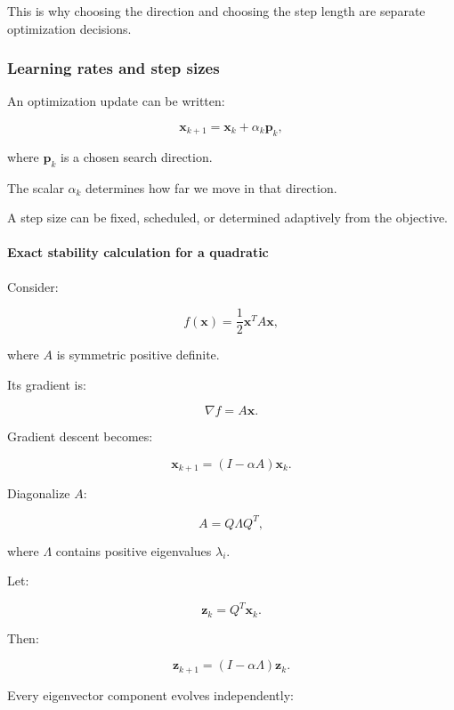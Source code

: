 This is why choosing the direction and choosing the step length are separate optimization decisions.

\subsubsection{Learning rates and step sizes}\label{02-foundations-ii-ch026-learning-rates-and-step-sizes}

\hypertarget{02-foundations-ii-ch026-learning-rates-and-step-sizes}{}

An optimization update can be written:

\[
\mathbf x_{k+1}=\mathbf x_k+\alpha_k\mathbf p_k,
\]

where \(\mathbf p_k\) is a chosen search direction.

The scalar \(\alpha_k\) determines how far we move in that direction.

A step size can be fixed, scheduled, or determined adaptively from the objective.

\paragraph{Exact stability calculation for a quadratic}\label{02-foundations-ii-ch026-exact-stability-calculation-for-a-quadratic}

\hypertarget{02-foundations-ii-ch026-exact-stability-calculation-for-a-quadratic}{}

Consider:

\[
f(\mathbf x)=\frac12\mathbf x^TA\mathbf x,
\]

where \(A\) is symmetric positive definite.

Its gradient is:

\[
\nabla f=A\mathbf x.
\]

Gradient descent becomes:

\[
\mathbf x_{k+1} = (I-\alpha A)\mathbf x_k.
\]

Diagonalize \(A\):

\[
A=Q\Lambda Q^T,
\]

where \(\Lambda\) contains positive eigenvalues \(\lambda_i\).

Let:

\[
\mathbf z_k=Q^T\mathbf x_k.
\]

Then:

\[
\mathbf z_{k+1} = (I-\alpha\Lambda)\mathbf z_k.
\]

Every eigenvector component evolves independently:

